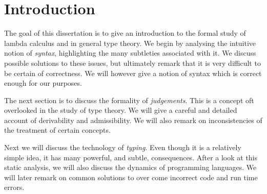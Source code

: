 \begin{comment}
\section{Introduction}

The goal of this thesis is to introduce dependent types to the undergraduate reader. We set out 

The goal of this dissertation is to learn how to mathematically design a programming language. 


The aim of this thesis is to introduce the notion of dependent types to an undergraduate reader. The main idea of dependent types is very simple, yet deceptively subtle however, since modelling such a formalism is quite tricky. This is evidenced by the fact that there is a lot of disagreement in type theory what has or hasn't been proven. This however is a familiar story in mathematics and is usually remedied by trying to understand what has been done better. Usually with the help of a new perspective. 

Dependent types however, are not only of interest to mathematicians but also programmers. Dependent type theory (much like simply typed lambda calculus) is very much a programming language allowing the expression of ideas previously too difficult to express. This is very much facilitated by its deep connection to predicate logic.
\end{comment}

\section{Introduction}

The goal of this dissertation is to give an introduction to the formal study of lambda calculus and in general type theory. We begin by analysing the intuitive notion of \emph{syntax}, highlighting the many subtleties associated with it. We discuss possible solutions to these issues, but ultimately remark that it is very difficult to be certain of correctness. We will however give a notion of syntax which is correct enough for our purposes.

The next section is to discuss the formality of \emph{judgements}. This is a concept oft overlooked in the study of type theory. We will give a careful and detailed account of derivability and admissibility. We will also remark on inconsistencies of the treatment of certain concepts.

Next we will discuss the technology of \emph{typing}. Even though it is a relatively simple idea, it has many powerful, and subtle, consequences. After a look at this static analysis, we will also discuss the dynamics of programming languages. We will later remark on common solutions to over come incorrect code and run time errors.

